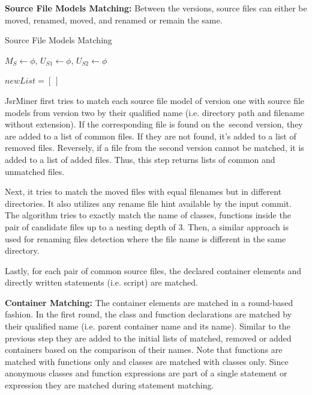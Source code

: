 \documentclass[letterpaper,12pt,onecolumn,final]{report}
\begin{document}
\textbf{Source File Models Matching:} 
Between the versions, source files can either be moved, renamed, moved, and renamed or remain the same.

\begin{algorithm}
\caption{Source File Models Matching}\label{alg:algo1}


$M_{S} \gets \phi$, $U_{S1} \gets \phi$, $U_{S2} \gets \phi$\;

$newList = [\ ]$
\end{algorithm}

JsrMiner first tries to match each source file model of version one with source file models from version two by their qualified name (i.e. directory path and filename without extension). If the corresponding file is found on the second version, they are added to a list of common files. If they are not found, it's added to a list of removed files. Reversely, if a file from the second version cannot be matched, it is added to a list of added files. Thus, this step returns lists of common and unmatched files.

Next, it tries to match the moved files with equal filenames but in different directories. It also utilizes any rename file hint available by the input commit. The algorithm tries to exactly match the name of classes, functions inside the pair of candidate files up to a nesting depth of 3. Then, a similar approach is used for renaming files detection where the file name is different in the same directory.

Lastly, for each pair of common source files, the declared container elements and directly written statements (i.e. script) are matched.

\textbf{Container Matching:} 
The container elements are matched in a round-based fashion. In the first round, the class and function declarations are matched by their qualified name (i.e. parent container name and its name). Similar to the previous step they are added to the initial lists of matched, removed or added containers based on the comparison of their names. Note that functions are matched with functions only and classes are matched with classes only. Since anonymous classes and function expressions are part of a single statement or expression they are matched during statement matching.
\end{document}
